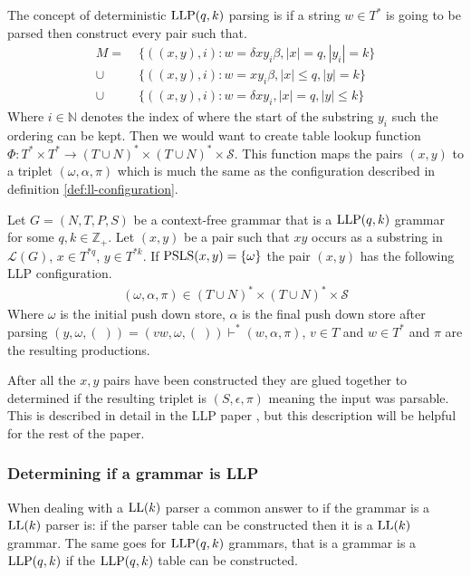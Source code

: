 The concept of deterministic $\text{LLP}(q,k)$ parsing is if a string $w \in T^*$ is going to be parsed then construct every pair such that.
\begin{align*}
    M =&\; \{((x, y), i) : w = \delta xy_i \beta, |x| = q, |y_i| = k\} \\
    \cup&\; \{((x, y), i) : w = xy_i \beta, |x| \leq q, |y| = k\} \\
    \cup&\; \{((x, y), i) : w = \delta xy_i, |x| = q, |y| \leq k\}
\end{align*}
Where $i \in \mathbb{N}$ denotes the index of where the start of the substring $y_i$ such the ordering can be kept. Then we would want to create table lookup function $\Phi: T^* \times T^* \to (T \cup N)^* \times (T \cup N)^* \times \mathcal{S}$. This function maps the pairs $(x,y)$ to a triplet $(\omega, \alpha, \pi)$ which is much the same as the configuration described in definition \ref{def:ll-configuration}. 
\begin{definition}
    \label{def:llp-configuration}
    Let $G = (N, T, P, S)$ be a context-free grammar that is a $\text{LLP}(q, k)$ grammar for some $q, k \in \mathbb{Z}_+$. Let $(x, y)$ be a pair such that $xy$ occurs as a substring in $\mathcal{L}(G)$, $x \in T^{*q}$, $y \in T^{*k}$. If $\text{PSLS}(x,y) = \{\omega\}$ the pair $(x, y)$ has the following LLP configuration.
    \begin{align*}
        (\omega, \alpha, \pi) \in (T \cup N)^* \times (T \cup N)^* \times \mathcal{S}
    \end{align*}
    Where $\omega$ is the initial push down store, $\alpha$ is the final push down store after parsing $(y, \omega, (\;)) = (vw, \omega, (\;)) \vdash^* (w, \alpha, \pi)$, $v \in T$ and $w \in T^*$ and $\pi$ are the resulting productions.
\end{definition}
\noindent After all the $x, y$ pairs have been constructed they are glued together to determined if the resulting triplet is $(S, \epsilon, \pi)$ meaning the input was parsable. This is described in detail in the LLP paper \cite[7]{Vagner2007}, but this description will be helpful for the rest of the paper.

\subsubsection{Determining if a grammar is LLP}
When dealing with a $\text{LL}(k)$ parser a common answer to if the grammar is a $\text{LL}(k)$ parser is: if the parser table can be constructed then it is a $\text{LL}(k)$ grammar. The same goes for $\text{LLP}(q,k)$ grammars, that is a grammar is a $\text{LLP}(q,k)$ if the $\text{LLP}(q, k)$ table can be constructed.

